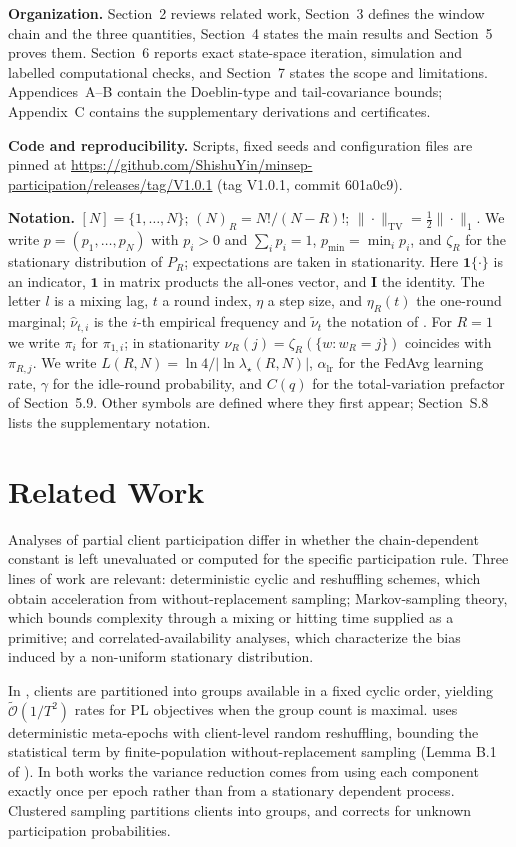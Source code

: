 \documentclass[twoside,11pt]{article}
\newcommand{\repourl}{\url{https://github.com/ShishuYin/minsep-participation/releases/tag/V1.0.1}}
\begin{document}
\textbf{Organization.} Section~2 reviews related work, Section~3 defines the window chain and the three quantities, Section~4 states the main results and Section~5 proves them. Section~6 reports exact state-space iteration, simulation and labelled computational checks, and Section~7 states the scope and limitations. Appendices~A--B contain the Doeblin-type and tail-covariance bounds; Appendix~C contains the supplementary derivations and certificates.

\textbf{Code and reproducibility.} Scripts, fixed seeds and configuration files are pinned at \repourl{} (tag V1.0.1, commit 601a0c9).

\textbf{Notation.} $[N]=\{1,\dots,N\}$; $(N)_R=N!/(N-R)!$; $\|\cdot\|_{\mathrm{TV}}=\frac12\|\cdot\|_1$. We write $p=(p_1,\dots,p_N)$ with $p_i>0$ and $\sum_i p_i=1$, $p_{\min}=\min_i p_i$, and $\zeta_R$ for the stationary distribution of $P_R$; expectations are taken in stationarity. Here $\mathbf{1}\{\cdot\}$ is an indicator, $\mathbf{1}$ in matrix products the all-ones vector, and $\mathbf{I}$ the identity. The letter $l$ is a mixing lag, $t$ a round index, $\eta$ a step size, and $\eta_R(t)$ the one-round marginal; $\hat\nu_{t,i}$ is the $i$-th empirical frequency and $\tilde\nu_t$ the notation of \citep{ref1}. For $R=1$ we write $\pi_i$ for $\pi_{1,i}$; in stationarity $\nu_R(j)=\zeta_R(\{w:w_R=j\})$ coincides with $\pi_{R,j}$. We write $L(R,N)=\ln4/|\ln\lambda_\star(R,N)|$, $\alpha_{\mathrm{lr}}$ for the FedAvg learning rate, $\gamma$ for the idle-round probability, and $C(q)$ for the total-variation prefactor of Section~5.9.
Other symbols are defined where they first appear; Section~S.8 lists the
supplementary notation.

\section{Related Work}
Analyses of partial client participation differ in whether the chain-dependent constant is left unevaluated or computed for the specific participation rule. Three lines of work are relevant: deterministic cyclic and reshuffling schemes, which obtain acceleration from without-replacement sampling; Markov-sampling theory, which bounds complexity through a mixing or hitting time supplied as a primitive; and correlated-availability analyses, which characterize the bias induced by a non-uniform stationary distribution.

In \citep{ref6}, clients are partitioned into groups available in a fixed cyclic order, yielding $\widetilde{\mathcal{O}}(1/T^{2})$ rates for PL objectives when the group count is maximal. \citet{ref7} uses deterministic meta-epochs with client-level random reshuffling, bounding the statistical term by finite-population without-replacement sampling (Lemma B.1 of \citep{ref7}). In both works the variance reduction comes from using each component exactly once per epoch rather than from a stationary dependent process. Clustered sampling \citep{ref8} partitions clients into groups, and \citep{ref12} corrects for unknown participation probabilities.
\end{document}
